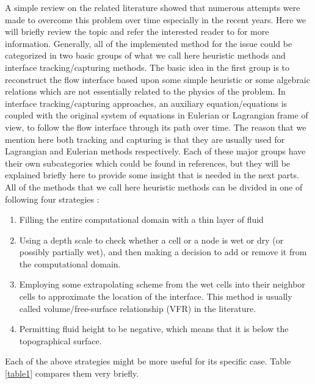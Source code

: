 \documentclass[letterpaper,10pt]{article}
\begin{document}
A simple review on the related literature showed that 
numerous attempts were made to overcome this problem over time especially in the recent years.
Here we will briefly review the topic and refer the interested reader to \cite{Medeiros2013,Balzano1998} 
for more information. \newline
Generally, all of the implemented method for the issue could be 
categorized in two basic groups of what we call here heuristic methods and interface tracking/capturing methods.
The basic idea in the first group is to reconstruct the flow interface based upon 
some simple heuristic or some algebraic relations which are not essentially related
to the physics of the problem. In interface tracking/capturing approaches, an auxiliary equation/equations 
is coupled with the original system of equations in Eulerian or Lagrangian frame of view, to follow 
the flow interface through its path over time. 
The reason that we mention here both tracking and capturing is that 
they are usually used for Lagrangian and Eulerian methods respectively.
Each of these major groups have their own subcategories which could be found in  
\cite{Chen1997,Sethian2003,DAnderson1998,Hirt1981} references, but they will be explained briefly here 
to provide some insight that is needed in the next parts.\newline
All of the methods that we call here heuristic methods 
can be divided in one of following four strategies \cite{Medeiros2013}: 
\begin{enumerate}
 
 \item Filling the entire computational domain with a thin layer of fluid
 \item Using a depth scale to check whether a cell or a node is wet or dry 
 (or possibly partially wet), and then  making a decision to add or remove it 
 from the computational domain.
 \item Employing some extrapolating scheme from the wet cells into their neighbor 
 cells to approximate the location of the interface. This method is usually called 
 volume/free-surface relationship (VFR) in the literature.
 \item Permitting fluid height to be negative, which means that it is below the topographical surface.
\end{enumerate}
Each of the above strategies might be more useful for its specific case. Table \ref{table1}
compares them very briefly.
\end{document}
